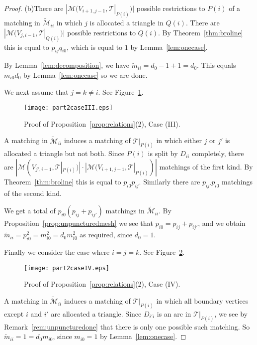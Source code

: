 \documentclass[a4paper]{amsart}
\begin{document}
\begin{proof}
(b)There are
$|{\mathcal M}(V_{i+1,j-1},{\mathcal T}|_{P(i)})|$ possible restrictions to $P(i)$ of a matching
in $\widetilde{\mathcal M}_{ii}$ in which $j$ is allocated a triangle in $Q(i)$.
There are $|{\mathcal M}(V_{j,i-1},{\mathcal T}|_{Q(i)})|$ possible restrictions to $Q(i)$.
By Theorem~\ref{thm:broline} this is equal to $p_{ij}q_{i0}$,
which is equal to $1$ by Lemma~\ref{lem:onecase}.

By Lemma~\ref{lem:decomposition}, we have $\widetilde{m}_{ii}=d_0-1+1=d_0$.
This equals $m_{i0}d_0$ by Lemma~\ref{lem:onecase} so we are done.

We next assume that $j=k\not=i$.
See Figure~\ref{fig:part2caseIII}.
\begin{figure}
\begin{center}
\texttt{[image: part2caseIII.eps]}
\caption{Proof of Proposition~\ref{prop:relations}(2), Case (III).}
\label{fig:part2caseIII}
\end{center}
\end{figure}

A matching in $\widetilde{\mathcal M}_{ii}$ induces a matching of ${\mathcal T}|_{P(i)}$
in which either $j$ or $j'$ is allocated a triangle but not both.
Since $P(i)$ is split by $D_{ii}$ completely, there are
$|{\mathcal M}(V_{j',i-1},{\mathcal T}|_{P(i)})|\cdot |{\mathcal M}(V_{i+1,j-1},{\mathcal T}|_{P(i)})|$
matchings of the first kind. By Theorem~\ref{thm:broline} this is equal to
$p_{i0}p_{ij}$.
Similarly there are $p_{ij'}p_{i0}$ matchings of the second kind.

We get a total of $p_{i0}(p_{ij}+p_{ij'})$ matchings in $\widetilde{\mathcal M}_{ii}$.
By Proposition~\ref{prop:unpuncturedmesh} we see that $p_{i0}=p_{ij}+p_{ij'}$,
and we obtain $\widetilde{m}_{ii}=p_{i0}^2=m_{i0}^2=d_0m_{i0}^2$ as required,
since $d_0=1$.

Finally we consider the case where $i=j=k$.
See Figure~\ref{fig:part2caseIV}.
\begin{figure}
\begin{center}
\texttt{[image: part2caseIV.eps]}
\caption{Proof of Proposition~\ref{prop:relations}(2), Case (IV).}
\label{fig:part2caseIV}
\end{center}
\end{figure}

A matching in $\widetilde{\mathcal M}_{ii}$ induces a matching of ${\mathcal T}|_{P(i)}$
in which all boundary vertices except $i$ and $i'$ are allocated a
triangle. Since $D_{i'i}$ is an arc in ${\mathcal T}|_{P(i)}$, we see by
Remark~\ref{rem:unpuncturedone} that there is only one possible such matching.
So $\widetilde{m}_{ii}=1=d_0m_{i0}$, since $m_{i0}=1$
by Lemma~\ref{lem:onecase}.


\end{proof}
\end{document}
